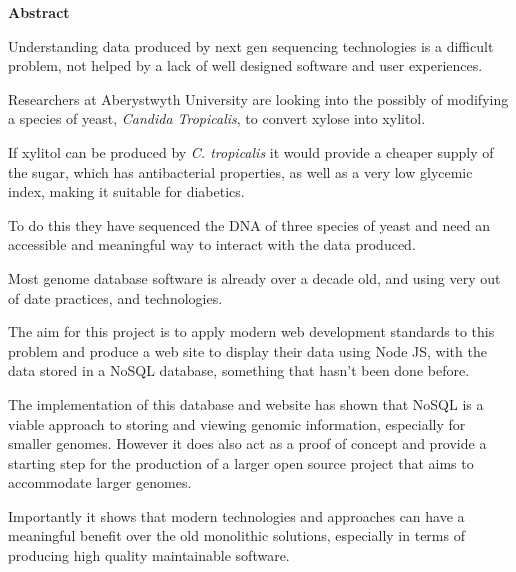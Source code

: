 \thispagestyle{empty}

\begin{center}
    {\LARGE\bf Abstract}
\end{center}

Understanding data produced by next gen sequencing technologies is a difficult problem, not helped by a lack of well designed software and user experiences. 

Researchers at Aberystwyth University are looking into the possibly of modifying a species of yeast, \textit{Candida Tropicalis}, to convert xylose into xylitol. 

If xylitol can be produced by \textit{C. tropicalis} it would provide a cheaper supply of the sugar, which has antibacterial properties, as well as a very low glycemic index, making it suitable for diabetics.

To do this they have sequenced the DNA of three species of yeast and need an accessible and meaningful way to interact with the data produced. 

Most genome database software is already over a decade old, and using very out of date practices, and technologies. 

The aim for this project is to apply modern web development standards to this problem and produce a web site to display their data using Node JS, with the data stored in a NoSQL database, something that hasn't been done before. 

The implementation of this database and website has shown that NoSQL is a viable approach to storing and viewing genomic information, especially for smaller genomes. However it does also act as a proof of concept and provide a starting step for the production of a larger open source project that aims to accommodate larger genomes. 

Importantly it shows that modern technologies and approaches can have a meaningful benefit over the old monolithic solutions, especially in terms of producing high quality maintainable software.
